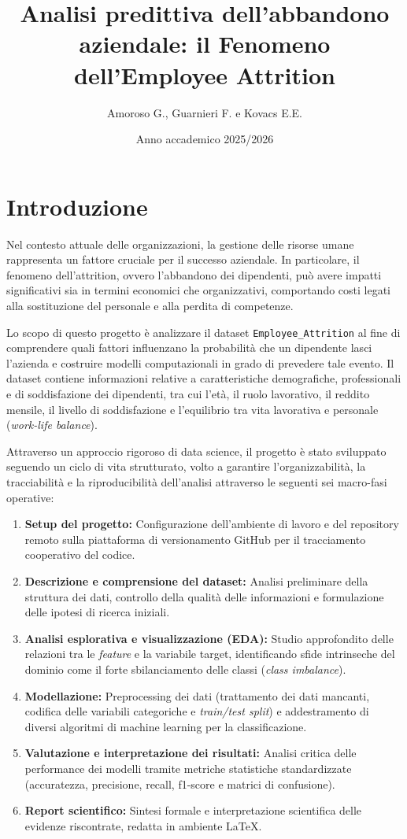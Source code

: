 \documentclass[11pt,a4paper]{article}
\title{Analisi predittiva dell'abbandono aziendale: il Fenomeno dell'Employee Attrition}
\author{Amoroso G., Guarnieri F. e Kovacs E.E.}
\date{Anno accademico 2025/2026}
\begin{document}
\maketitle

\section{Introduzione}
Nel contesto attuale delle organizzazioni, la gestione delle risorse umane rappresenta un fattore cruciale per il successo aziendale. In particolare, il fenomeno dell’attrition, ovvero l’abbandono dei dipendenti, può avere impatti significativi sia in termini economici che organizzativi, comportando costi legati alla sostituzione del personale e alla perdita di competenze.

Lo scopo di questo progetto è analizzare il dataset \texttt{Employee\_Attrition} al fine di comprendere quali fattori influenzano la probabilità che un dipendente lasci l'azienda e costruire modelli computazionali in grado di prevedere tale evento. Il dataset contiene informazioni relative a caratteristiche demografiche, professionali e di soddisfazione dei dipendenti, tra cui l'età, il ruolo lavorativo, il reddito mensile, il livello di soddisfazione e l'equilibrio tra vita lavorativa e personale (\textit{work-life balance}).

Attraverso un approccio rigoroso di data science, il progetto è stato sviluppato seguendo un ciclo di vita strutturato, volto a garantire l'organizzabilità, la tracciabilità e la riproducibilità dell'analisi attraverso le seguenti sei macro-fasi operative:
\begin{enumerate}
    \item \textbf{Setup del progetto:} Configurazione dell'ambiente di lavoro e del repository remoto sulla piattaforma di versionamento GitHub per il tracciamento cooperativo del codice.
    \item \textbf{Descrizione e comprensione del dataset:} Analisi preliminare della struttura dei dati, controllo della qualità delle informazioni e formulazione delle ipotesi di ricerca iniziali.
    \item \textbf{Analisi esplorativa e visualizzazione (EDA):} Studio approfondito delle relazioni tra le \textit{feature} e la variabile target, identificando sfide intrinseche del dominio come il forte sbilanciamento delle classi (\textit{class imbalance}).
    \item \textbf{Modellazione:} Preprocessing dei dati (trattamento dei dati mancanti, codifica delle variabili categoriche e \textit{train/test split}) e addestramento di diversi algoritmi di machine learning per la classificazione.
    \item \textbf{Valutazione e interpretazione dei risultati:} Analisi critica delle performance dei modelli tramite metriche statistiche standardizzate (accuratezza, precisione, recall, f1-score e matrici di confusione).
    \item \textbf{Report scientifico:} Sintesi formale e interpretazione scientifica delle evidenze riscontrate, redatta in ambiente \LaTeX{}.
\end{enumerate}
\end{document}
